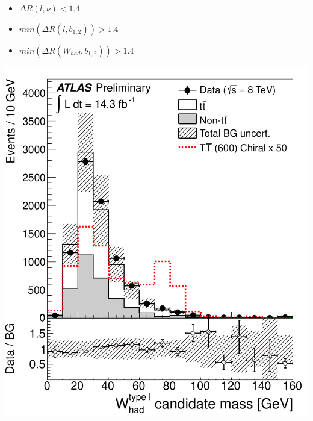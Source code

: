\documentclass[xcolor=dvipsnames,10pt]{beamer}
\begin{document}
\begin{frame}
\begin{minipage}{.65\textwidth}
\begin{minipage}{.55\textwidth}
    \begin{itemize}
    \item $\Delta R(l,\nu) < 1.4$
    \item $min(\Delta R(l,b_{1,2})) > 1.4$
    \item $min(\Delta R(W_{had},b_{1,2})) > 1.4$
    \end{itemize}

     \includegraphics[width=.8\textwidth]{wbx/fig_02a.pdf}

  \end{minipage}

%


    \end{minipage}\begin{minipage}{.35\textwidth}
\centering\scriptsize


\end{minipage}
\end{frame}
\end{document}
